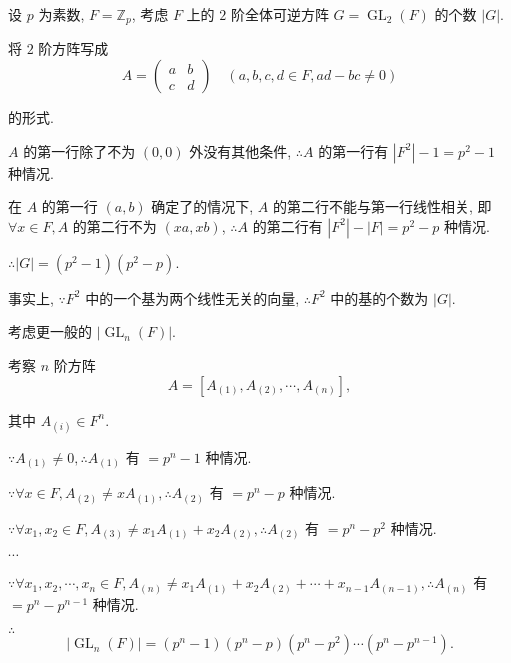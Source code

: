 \documentclass{ctexart}
\begin{document}
\begin{example}
    设 $p$ 为素数, $F=\mathbb{Z}_p$, 考虑 $F$ 上的 $2$ 阶全体可逆方阵 $G=\operatorname{GL}_2(F)$ 的个数 $|G|$.

    将 $2$ 阶方阵写成
    \[A=\begin{pmatrix}
        a & b \\
        c & d
    \end{pmatrix}\quad(a,b,c,d\in F,ad-bc\neq0)\]

    的形式.

    $A$ 的第一行除了不为 $(0,0)$ 外没有其他条件, $\therefore A$ 的第一行有 $|F^2|-1=p^2-1$ 种情况.

    在 $A$ 的第一行 $(a,b)$ 确定了的情况下, $A$ 的第二行不能与第一行线性相关, 即 $\forall x\in F,A$ 的第二行不为 $(xa,xb)$, $\therefore A$ 的第二行有 $|F^2|-|F|=p^2-p$ 种情况.

    $\therefore|G|=(p^2-1)(p^2-p)$.

    事实上, $\because F^2$ 中的一个基为两个线性无关的向量, $\therefore F^2$ 中的基的个数为 $|G|$.

    考虑更一般的 $|\operatorname{GL}_n(F)|$.

    考察 $n$ 阶方阵
    \[A=[A_{(1)},A_{(2)},\cdots,A_{(n)}],\]

    其中 $A_{(i)}\in F^n$.

    $\because A_{(1)}\neq0,\therefore A_{(1)}$ 有 $=p^n-1$ 种情况.

    $\because\forall x\in F,A_{(2)}\neq xA_{(1)},\therefore A_{(2)}$ 有 $=p^n-p$ 种情况.

    $\because\forall x_1,x_2\in F,A_{(3)}\neq x_1A_{(1)}+x_2A_{(2)},\therefore A_{(2)}$ 有 $=p^n-p^2$ 种情况.

    $\cdots$

    $\because\forall x_1,x_2,\cdots,x_n\in F,A_{(n)}\neq x_1A_{(1)}+x_2A_{(2)}+\cdots+x_{n-1}A_{(n-1)},\therefore A_{(n)}$ 有 $=p^n-p^{n-1}$ 种情况.

    $\therefore$
    \[|\operatorname{GL}_n(F)|=(p^n-1)(p^n-p)(p^n-p^2)\cdots(p^n-p^{n-1}).\]
\end{example}
\end{document}
